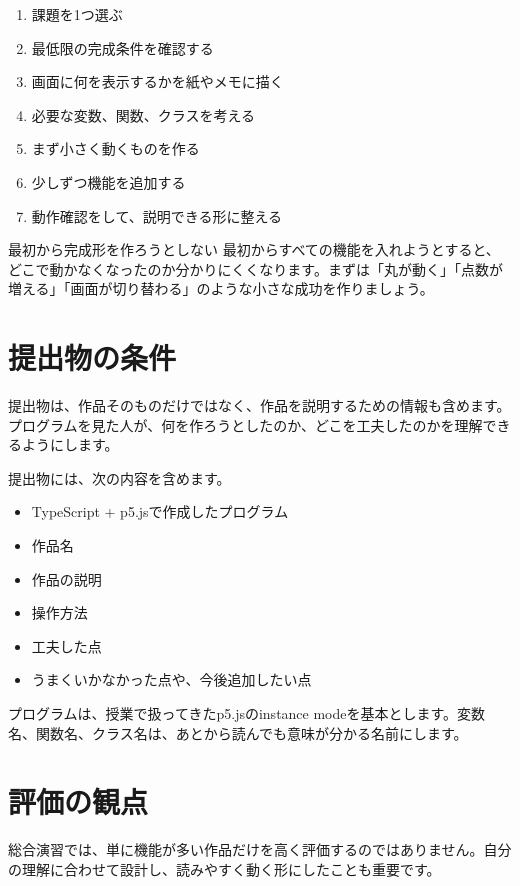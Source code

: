 \begin{enumerate}
    \item 課題を1つ選ぶ
    \item 最低限の完成条件を確認する
    \item 画面に何を表示するかを紙やメモに描く
    \item 必要な変数、関数、クラスを考える
    \item まず小さく動くものを作る
    \item 少しずつ機能を追加する
    \item 動作確認をして、説明できる形に整える
\end{enumerate}

\begin{notebox}{最初から完成形を作ろうとしない}
最初からすべての機能を入れようとすると、どこで動かなくなったのか分かりにくくなります。まずは「丸が動く」「点数が増える」「画面が切り替わる」のような小さな成功を作りましょう。
\end{notebox}

\section{提出物の条件}

提出物は、作品そのものだけではなく、作品を説明するための情報も含めます。プログラムを見た人が、何を作ろうとしたのか、どこを工夫したのかを理解できるようにします。

提出物には、次の内容を含めます。

\begin{itemize}
    \item TypeScript + p5.jsで作成したプログラム
    \item 作品名
    \item 作品の説明
    \item 操作方法
    \item 工夫した点
    \item うまくいかなかった点や、今後追加したい点
\end{itemize}

プログラムは、授業で扱ってきたp5.jsのinstance modeを基本とします。変数名、関数名、クラス名は、あとから読んでも意味が分かる名前にします。

\section{評価の観点}

総合演習では、単に機能が多い作品だけを高く評価するのではありません。自分の理解に合わせて設計し、読みやすく動く形にしたことも重要です。

